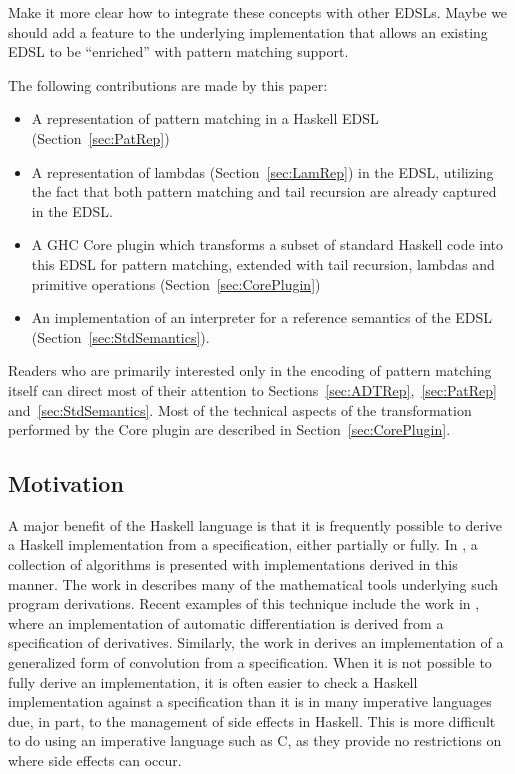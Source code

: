 \documentclass[runningheads, a4paper]{llncs}
\newenvironment{todo}
  {\ifthenelse{\isundefined{\showtodos}}{\comment}{\begin{tcolorbox}
    \textbf{TODO}:}}
  {\ifthenelse{\isundefined{\showtodos}}{\endcomment}{\end{tcolorbox}}
  }
\begin{document}
\begin{todo}
  Make it more clear how to integrate these concepts with other EDSLs. Maybe we should
  add a feature to the underlying implementation that allows an existing EDSL to be
  ``enriched'' with pattern matching support.
\end{todo}

The following contributions are made by this paper:

\begin{itemize}
  \item A representation of pattern matching in a Haskell EDSL (Section~\ref{sec:PatRep})
  \item A representation of lambdas (Section~\ref{sec:LamRep}) in the EDSL, utilizing
  the fact that both pattern matching and tail recursion are already captured in
  the EDSL.
  \item A GHC Core plugin which transforms a subset of standard Haskell code
  into this EDSL for pattern matching, extended with tail recursion,
  lambdas and primitive operations (Section~\ref{sec:CorePlugin})
  \item An implementation of an interpreter for a reference semantics of the EDSL (Section~\ref{sec:StdSemantics}).
\end{itemize}

Readers who are primarily interested only in the encoding of pattern matching itself can direct
most of their attention to Sections~\ref{sec:ADTRep},~\ref{sec:PatRep} and~\ref{sec:StdSemantics}. Most of the technical aspects of
the transformation performed by the Core plugin are described in Section~\ref{sec:CorePlugin}.

\subsection{Motivation}

A major benefit of the Haskell language is that it is frequently possible to
derive a Haskell implementation from a specification, either partially or fully.
In \cite{Bird:2010:Pearls}, a collection of algorithms is presented with implementations derived in this
manner. The work in \cite{Gibbons:2002:Calc} describes many of the
mathematical tools underlying such program derivations.
Recent examples of this technique include the work in
\cite{Elliott-2018-ad-icfp}, where an implementation of automatic
differentiation is derived from a specification
of derivatives.  Similarly, the work in
\cite{Elliott2019-convolution-extended} derives an implementation of a
generalized form of convolution from a specification.  When it is not possible to fully derive an implementation, it is often easier to check a Haskell implementation against a
specification than it is in many imperative languages due, in part, to the
management of side effects in Haskell. This is more difficult to do using an
imperative language such as C, as they provide no restrictions on where side
effects can occur.
\end{document}
